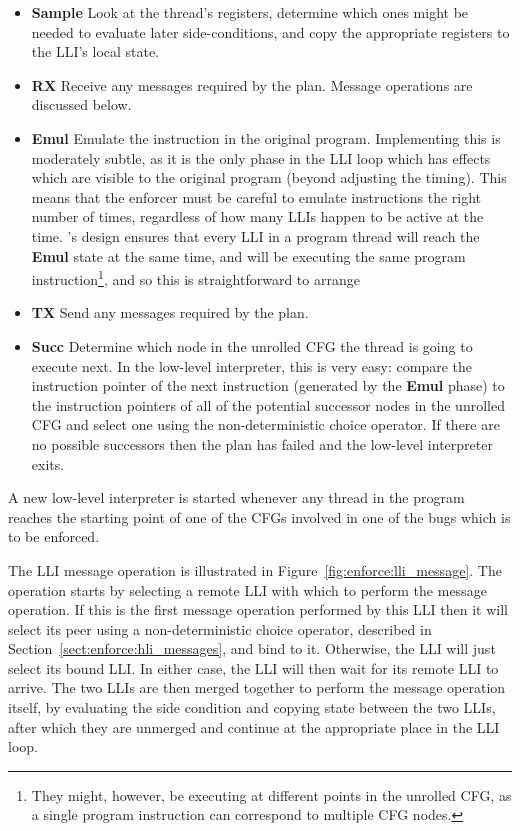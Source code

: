 \begin{itemize}
\item \textbf{Sample} Look at the thread's registers, determine which
  ones might be needed to evaluate later side-conditions, and copy the
  appropriate registers to the LLI's local state.

\item \textbf{RX} Receive any messages required by the plan.  Message
  operations are discussed below.

\item \textbf{Emul} Emulate the instruction in the original program.
  Implementing this is moderately subtle, as it is the only phase in
  the LLI loop which has effects which are visible to the original
  program (beyond adjusting the timing).  This means that the enforcer
  must be careful to emulate instructions the right number of times,
  regardless of how many LLIs happen to be active at the time.
  {\Technique}'s design ensures that every LLI in a program thread
  will reach the \textbf{Emul} state at the same time, and will be
  executing the same program instruction\footnote{They might, however,
    be executing at different points in the unrolled CFG, as a single
    program instruction can correspond to multiple CFG nodes.}, and so
  this is straightforward to arrange

\item \textbf{TX} Send any messages required by the plan.

\item \textbf{Succ} Determine which node in the unrolled CFG the
  thread is going to execute next.  In the low-level interpreter, this
  is very easy: compare the instruction pointer of the next
  instruction (generated by the \textbf{Emul} phase) to the
  instruction pointers of all of the potential successor nodes in the
  unrolled CFG and select one using the non-deterministic choice
  operator.  If there are no possible successors then the plan has
  failed and the low-level interpreter exits.
\end{itemize}

A new low-level interpreter is started whenever any thread in the
program reaches the starting point of one of the CFGs involved in one
of the bugs which is to be enforced.

The LLI message operation is illustrated in
Figure~\ref{fig:enforce:lli_message}.  The operation starts by
selecting a remote LLI with which to perform the message operation.
If this is the first message operation performed by this LLI then it
will select its peer using a non-deterministic choice operator,
described in Section~\ref{sect:enforce:hli_messages}, and bind to it.
Otherwise, the LLI will just select its bound LLI.  In either case,
the LLI will then wait for its remote LLI to arrive.  The two LLIs are
then merged together to perform the message operation itself, by
evaluating the side condition and copying state between the two LLIs,
after which they are unmerged and continue at the appropriate place in
the LLI loop.


